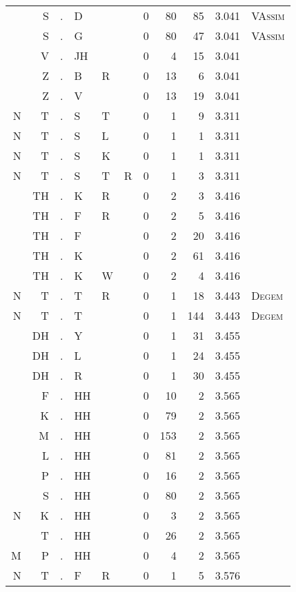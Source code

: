 \begin{longtable}{r@{ } r@{ } c@{ } l@{ } l@{ } l@{ } r r r r l }
  & S & . & D &   &   & 0 & 80 & 85 & 3.041 & \textsc{VAssim} \\
  & S & . & G &   &   & 0 & 80 & 47 & 3.041 & \textsc{VAssim} \\
  & V & . & JH &   &   & 0 & 4 & 15 & 3.041 &  \\
  & Z & . & B & R &   & 0 & 13 & 6 & 3.041 &  \\
  & Z & . & V &   &   & 0 & 13 & 19 & 3.041 &  \\
N & T & . & S & T &   & 0 & 1 & 9 & 3.311 &  \\
N & T & . & S & L &   & 0 & 1 & 1 & 3.311 &  \\
N & T & . & S & K &   & 0 & 1 & 1 & 3.311 &  \\
N & T & . & S & T & R & 0 & 1 & 3 & 3.311 &  \\
  & TH & . & K & R &   & 0 & 2 & 3 & 3.416 &  \\
  & TH & . & F & R &   & 0 & 2 & 5 & 3.416 &  \\
  & TH & . & F &   &   & 0 & 2 & 20 & 3.416 &  \\
  & TH & . & K &   &   & 0 & 2 & 61 & 3.416 &  \\
  & TH & . & K & W &   & 0 & 2 & 4 & 3.416 &  \\
N & T & . & T & R &   & 0 & 1 & 18 & 3.443 & \textsc{Degem} \\
N & T & . & T &   &   & 0 & 1 & 144 & 3.443 & \textsc{Degem} \\
  & DH & . & Y &   &   & 0 & 1 & 31 & 3.455 &  \\
  & DH & . & L &   &   & 0 & 1 & 24 & 3.455 &  \\
  & DH & . & R &   &   & 0 & 1 & 30 & 3.455 &  \\
  & F & . & HH &   &   & 0 & 10 & 2 & 3.565 &  \\
  & K & . & HH &   &   & 0 & 79 & 2 & 3.565 &  \\
  & M & . & HH &   &   & 0 & 153 & 2 & 3.565 &  \\
  & L & . & HH &   &   & 0 & 81 & 2 & 3.565 &  \\
  & P & . & HH &   &   & 0 & 16 & 2 & 3.565 &  \\
  & S & . & HH &   &   & 0 & 80 & 2 & 3.565 &  \\
N & K & . & HH &   &   & 0 & 3 & 2 & 3.565 &  \\
  & T & . & HH &   &   & 0 & 26 & 2 & 3.565 &  \\
M & P & . & HH &   &   & 0 & 4 & 2 & 3.565 &  \\
N & T & . & F & R &   & 0 & 1 & 5 & 3.576 &  \\

\end{longtable}
